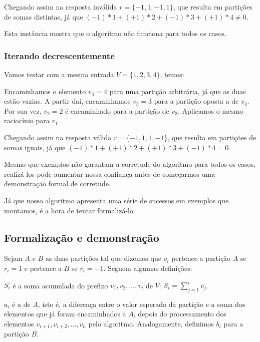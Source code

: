 Chegando assim na resposta inválida $r = \{-1, 1, -1, 1\}$, que resulta em partições de somas distintas, já que $(-1)*1 + (+1)*2 + (-1)*3 + (+1)*4 \neq 0$.

Esta instância mostra que o algoritmo não funciona para todos os casos.

\subsubsection*{Iterando decrescentemente}

Vamos testar com a mesma entrada $V = \{1, 2, 3, 4\}$, temos:

Encaminhamos o elemento $v_4 = 4$ para uma partição arbitrária, já que as duas estão vazias. A partir daí, encaminhamos $v_3 = 3$ para a partição oposta a de $v_4$. Por sua vez, $v_2 = 2$ é encaminhado para a partição de $v_3$. Aplicamos o mesmo raciocínio para $v_1$.

Chegando assim na resposta válida $r = \{-1, 1, 1, -1\}$, que resulta em partições de somas iguais, já que $(-1)*1 + (+1)*2 + (+1)*3 + (-1)*4 = 0$.

Mesmo que exemplos não garantam a corretude do algoritmo para todos os casos, realizá-los pode aumentar nossa confiança antes de começarmos uma demonstração formal de corretude.

Já que nosso algoritmo apresenta uma série de sucessos em exemplos que montamos, é a hora de tentar formalizá-lo.

\subsection*{Formalização e demonstração}

Sejam $A$ e $B$ as duas partições tal que dizemos que $v_i$ pertence a partição $A$ se $r_i = 1$ e pertence a $B$ se $r_i = -1$. Seguem algumas definições:

\begin{defi}
$S_i$ é a soma acumulada do prefixo $v_1, v_2, ..., v_i$ de $V$: $S_i = \sum_{j = 1}^{i} v_j$.
\end{defi}

\begin{defi}
$a_i$ é a  de $A$, isto é, a diferença entre o valor esperado da partição e a soma dos elementos que já foram encaminhados a $A$, depois do processamento dos elementos $v_{i + 1}, v_{i + 2}, ..., v_{n}$ pelo algoritmo.
Analogamente, definimos $b_i$ para a partição $B$.
\end{defi}

